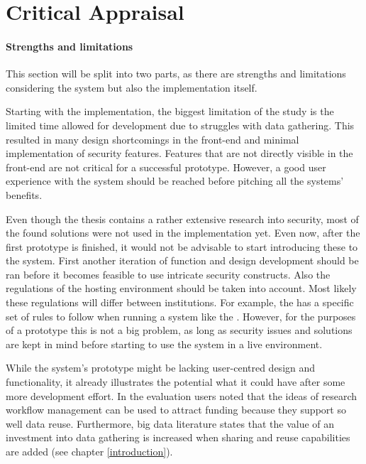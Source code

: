 \section{Critical Appraisal}

\paragraph{Strengths and limitations}
This section will be split into two parts, as there are strengths and limitations considering the system but also the implementation itself.

Starting with the implementation, the biggest limitation of the study is the limited time allowed for development due to struggles with data gathering.
This resulted in many design shortcomings in the front-end and minimal implementation of security features.
Features that are not directly visible in the front-end are not critical for a successful prototype.
However, a good user experience with the system should be reached before pitching all the systems' benefits.

Even though the thesis contains a rather extensive research into security, most of the found solutions were not used in the \ivfsystem{} implementation yet.
Even now, after the first prototype is finished, it would not be advisable to start introducing these to the system.
First another iteration of function and design development should be ran before it becomes feasible to use intricate security constructs.
Also the regulations of the hosting environment should be taken into account. 
Most likely these regulations will differ between institutions.
For example, the \AMC{} has a specific set of rules to follow when running a system like the \ivfsystem{}.
However, for the purposes of a prototype this is not a big problem, as long as security issues and solutions are kept in mind before starting to use the system in a live environment.

While the system's prototype might be lacking user-centred design and functionality, it already illustrates the potential what it could have after some more development effort.
In the evaluation users noted that the ideas of research workflow management can be used to attract funding because they support so well data reuse.
Furthermore, big data literature states that the value of an investment into data gathering is increased when sharing and reuse capabilities are added (see chapter \ref{introduction}).

